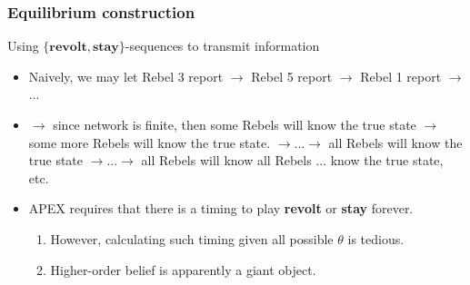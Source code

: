 \documentclass[10pt]{beamer}
\begin{document}
\begin{frame}
  \frametitle{Equilibrium construction}

Using $\{\textbf{revolt}, \textbf{stay}\}$-sequences to transmit information
\begin{itemize}
\item  Naively, we may let Rebel 3 report $\rightarrow$ Rebel 5 report $\rightarrow$ Rebel 1 report $\rightarrow$...


\begin{center} 
\end{center} 
\item $\rightarrow$ since network is finite, then some Rebels will know the true state $\rightarrow$ some more Rebels will know the true state. $\rightarrow$...$\rightarrow$ all Rebels will know the true state $\rightarrow$...$\rightarrow$ all Rebels will know all Rebels ... know the true state, etc.
\item APEX requires that there is a timing to play \textbf{revolt} or \textbf{stay} forever.
\begin{enumerate}
\item However, calculating such timing given all possible $\theta$ is tedious.
\item Higher-order belief is apparently a giant object.
\end{enumerate} 
\end{itemize}

\end{frame}
\end{document}
